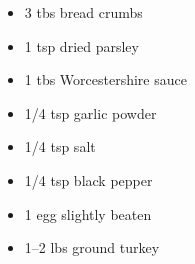
\fromMom

\ingredients
\begin{itemize}
\item 3 tbs bread crumbs
\item 1 tsp dried parsley
\item 1 tbs Worcestershire sauce
\item 1/4 tsp garlic powder
\item 1/4 tsp salt
\item 1/4 tsp black pepper
\item 1 egg slightly beaten
\item 1--2 lbs ground turkey
\end{itemize}
